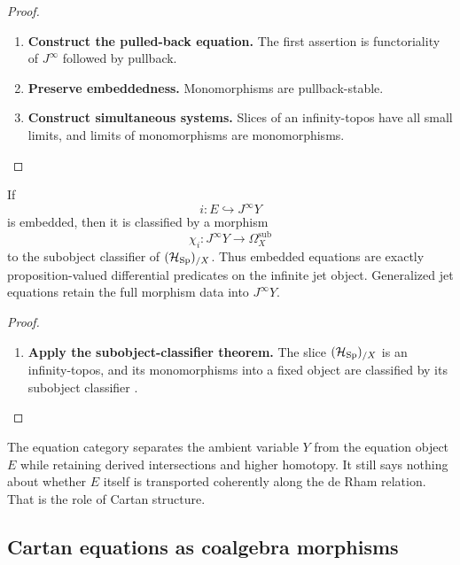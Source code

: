 \begin{proof}
\leavevmode
\begin{enumerate}[label=\textup{(\arabic*)}]
    \item \textbf{Construct the pulled-back equation.}
The first assertion is functoriality of \(J^\infty\) followed by pullback.

    \item \textbf{Preserve embeddedness.}
Monomorphisms are pullback-stable.

    \item \textbf{Construct simultaneous systems.}
Slices of an infinity-topos have all small
limits, and limits of monomorphisms are monomorphisms.
\end{enumerate}
\end{proof}

\begin{proposition}
If
\[
  i:E\hookrightarrow J^\infty Y
\]
is embedded, then it is classified by a morphism
\[
  \chi_i:J^\infty Y\longrightarrow\Omega_X^{\mathrm{sub}}
\]
to the subobject classifier of \((\mathcal H_{\operatorname{Sp}})_{/X}\). Thus embedded equations are
exactly proposition-valued differential predicates on the infinite jet object.
Generalized jet equations retain the full morphism data into \(J^\infty Y\).
\end{proposition}

\begin{proof}
\leavevmode
\begin{enumerate}[label=\textup{(\arabic*)}]
    \item \textbf{Apply the subobject-classifier theorem.}
The slice \((\mathcal H_{\operatorname{Sp}})_{/X}\) is an infinity-topos, and its
monomorphisms into a fixed object are classified by its subobject classifier
\cite{LurieHTT}.
\end{enumerate}
\end{proof}

The equation category separates the ambient variable \(Y\) from the equation
object \(E\) while retaining derived intersections and higher homotopy. It
still says nothing about whether \(E\) itself is transported coherently along
the de Rham relation. That is the role of Cartan structure.

\subsection{Cartan equations as coalgebra morphisms}
\label{sec:cartan-presentations}


